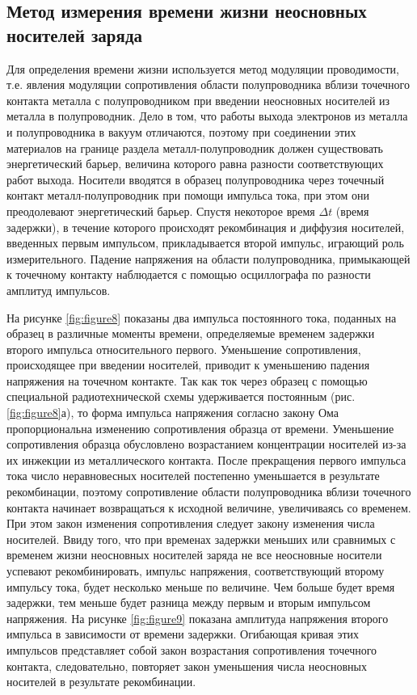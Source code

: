 \documentclass[a4paper,12pt]{article}
\begin{document}
\subsection{Метод измерения времени жизни неосновных носителей заряда}

Для определения времени жизни используется метод модуляции проводимости, т.е. явления модуляции сопротивления области полупроводника вблизи точечного контакта металла с полупроводником при введении неосновных носителей из металла в полупроводник. Дело в том, что работы выхода электронов из металла и полупроводника в вакуум отличаются, поэтому при соединении этих материалов на границе раздела металл-полупроводник должен существовать энергетический барьер, величина которого равна разности соответствующих работ выхода. Носители вводятся в образец полупроводника через точечный контакт металл-полупроводник при помощи импульса тока, при этом они преодолевают энергетический барьер. Спустя некоторое время $\Delta t$ (время задержки), в течение которого происходят рекомбинация и диффузия носителей, введенных первым импульсом, прикладывается второй импульс, играющий роль измерительного. Падение напряжения на области полупроводника, примыкающей к точечному контакту наблюдается с помощью осциллографа по разности амплитуд импульсов.


На рисунке \ref{fig:figure8} показаны два импульса постоянного тока, поданных на образец в различные моменты времени, определяемые временем задержки второго импульса относительного первого. Уменьшение сопротивления, происходящее при введении носителей, приводит к уменьшению падения напряжения на точечном контакте. Так как ток через образец с помощью специальной радиотехнической схемы удерживается постоянным (рис.  \ref{fig:figure8}а), то форма импульса напряжения согласно закону Ома пропорциональна изменению сопротивления образца от времени. Уменьшение сопротивления образца обусловлено возрастанием концентрации носителей из-за их инжекции из металлического контакта. После прекращения первого импульса тока число неравновесных носителей постепенно уменьшается в результате рекомбинации, поэтому сопротивление области полупроводника вблизи точечного контакта начинает возвращаться к исходной величине, увеличиваясь со временем. При этом закон изменения сопротивления следует закону изменения числа носителей. Ввиду того, что при временах задержки меньших или сравнимых с временем жизни неосновных носителей заряда не все неосновные носители успевают рекомбинировать, импульс напряжения, соответствующий второму импульсу тока, будет несколько меньше по величине. Чем больше будет время задержки, тем меньше будет разница между первым и вторым импульсом напряжения. На рисунке \ref{fig:figure9} показана амплитуда напряжения второго импульса в зависимости от времени задержки. Огибающая кривая этих импульсов представляет собой закон возрастания сопротивления точечного контакта, следовательно, повторяет закон уменьшения числа неосновных носителей в результате рекомбинации.
\end{document}
